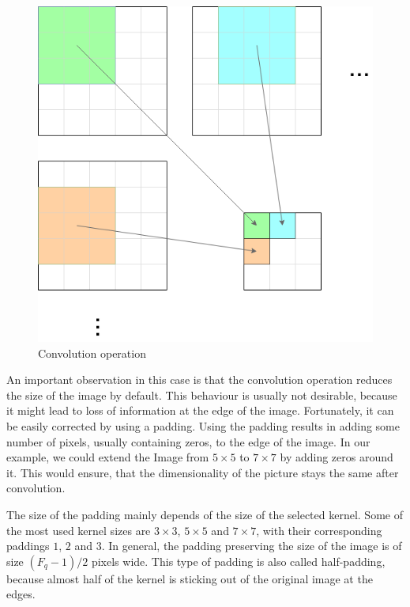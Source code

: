 \begin{figure}
    \centering
    \includegraphics[width=\linewidth]{imgs_andy/convolution.png}
    \caption{Convolution operation}
    \label{fig:convolution}
\end{figure}

An important observation in this case is that the convolution operation reduces the size of the image by default.
This behaviour is usually not desirable, because it might lead to loss of information at the edge of the image.
Fortunately, it can be easily corrected by using a padding.
Using the padding results in adding some number of pixels, usually containing zeros, to the edge of the image.
In our example, we could extend the Image from $5 \times 5$ to $7 \times 7$ by adding zeros around it.
This would ensure, that the dimensionality of the picture stays the same after convolution.

The size of the padding mainly depends of the size of the selected kernel.
Some of the most used kernel sizes are $3 \times 3$, $5 \times 5$ and $7 \times 7$, with their corresponding paddings $1$, $2$ and $3$.
In general, the padding preserving the size of the image is of size $(F_q - 1)/2$ pixels wide.
This type of padding is also called half-padding, because almost half of the kernel is sticking out of the original image at the edges.

